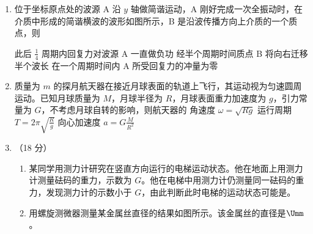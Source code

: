 \documentclass[\gkver]{gaokaozhenti}
\begin{document}
\begin{enumerate}
\item
位于坐标原点处的波源 A 沿 $y$ 轴做简谐运动，A 刚好完成一次全振动时，在介质中形成的简谐横波的波形如图所示，B 是沿波传播方向上介质的一个质点，则


{此后 $\frac{1}{4}$ 周期内回复力对波源 A 一直做负功}
{经半个周期时间质点 B 将向右迁移半个波长}
{在一个周期时间内 A 所受回复力的冲量为零}

\item
质量为 $m$ 的探月航天器在接近月球表面的轨道上飞行，其运动视为匀速圆周运动。已知月球质量为 $M$，月球半径为 $R$，月球表面重力加速度为 $g$，引力常量为 $G$，不考虑月球自转的影响，则航天器的
{角速度 $\omega=\sqrt{Rg}$}
{运行周期 $T=2\pi\sqrt{\frac{R}{g}}$}
{向心加速度 $a=G\frac{M}{R^{2}}$}

\item
（18 分）

\begin{enumerate}
	\item
	某同学用测力计研究在竖直方向运行的电梯运动状态。他在地面上用测力计测量砝码的重力，示数为 $G$。他在电梯中用测力计仍测量同一砝码的重力，发现测力计的示数小于 $G$，由此判断此时电梯的运动状态可能是\underline{\hspace{2cm}}。

	\item
	用螺旋测微器测量某金属丝直径的结果如图所示。该金属丝的直径是\underline{\hspace{1.6cm}}$\Umm$。


\end{enumerate}
\end{enumerate}
\end{document}
